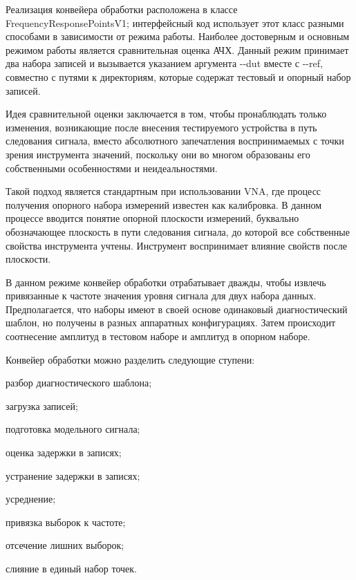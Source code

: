 \documentclass{report}
\begin{document}

Реализация конвейера обработки расположена в классе FrequencyResponsePointsV1; интерфейсный код использует этот класс разными способами в зависимости от режима работы.
Наиболее достоверным и основным режимом работы является сравнительная оценка АЧХ. Данный режим принимает два набора записей и вызывается указанием аргумента -{}-dut вместе с -{}-ref, совместно с путями к директориям, которые содержат тестовый и опорный набор записей.

Идея сравнительной оценки заключается в том, чтобы пронаблюдать только изменения, возникающие после внесения тестируемого устройства в путь следования сигнала, вместо абсолютного запечатления воспринимаемых с точки зрения инструмента значений, поскольку они во многом образованы его собственными особенностями и неидеальностями.

Такой подход является стандартным при использовании VNA, где процесс получения опорного набора измерений известен как калибровка. В данном процессе вводится понятие опорной плоскости измерений, буквально обозначающее плоскость в пути следования сигнала, до которой все собственные свойства инструмента учтены. Инструмент воспринимает влияние свойств после плоскости.

В данном режиме конвейер обработки отрабатывает дважды, чтобы извлечь привязанные к частоте значения уровня сигнала для двух набора данных. Предполагается, что наборы имеют в своей основе одинаковый диагностический шаблон, но получены в разных аппаратных конфигурациях. Затем происходит соотнесение амплитуд в тестовом наборе и амплитуд в опорном наборе.

Конвейер обработки можно разделить следующие ступени:

\begin{enummarker}
    \item разбор диагностического шаблона;
    \item загрузка записей;
    \item подготовка модельного сигнала;
    \item оценка задержки в записях;
    \item устранение задержки в записях;
    \item усреднение;
    \item привязка выборок к частоте;
    \item отсечение лишних выборок;
    \item слияние в единый набор точек.
\end{enummarker}
\end{document}
